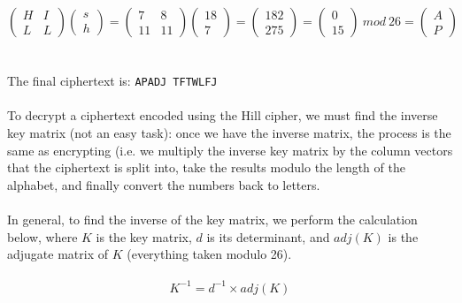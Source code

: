 \documentclass[Lau,binding=0.6cm,oneside]{sapthesis}
\begin{document}
\begin{equation}
\begin{pmatrix}H&I\\L&L\end{pmatrix}\begin{pmatrix}s\\h\end{pmatrix}=
\begin{pmatrix}7&8\\11&11\end{pmatrix}\begin{pmatrix}18\\7\end{pmatrix}=
\begin{pmatrix}182\\275\end{pmatrix}=
\begin{pmatrix}0\\15\end{pmatrix} \ mod \ 26=
\begin{pmatrix}A\\P\end{pmatrix}
\end{equation}
\ \\\\
The final ciphertext is: \colorbox{gray!12}{\small{\texttt{APADJ TFTWLFJ}}}\\\\
To decrypt a ciphertext encoded using the Hill cipher, we must find the inverse key matrix (not an easy task): once we have the inverse matrix, the process is the same as encrypting (i.e. we multiply the inverse key matrix by the column vectors that the ciphertext is split into, take the results modulo the length of the alphabet, and finally convert the numbers back to letters.\\\\
In general, to find the inverse of the key matrix, we perform the calculation below, where $K$ is the key matrix, $d$ is its determinant, and $adj{(K)}$ is the adjugate matrix of $K$ (everything taken modulo 26).\\\\
\begin{equation}
K^{-1} = d^{-1} \times adj{(K)}
\end{equation}
\ \\
\end{document}

